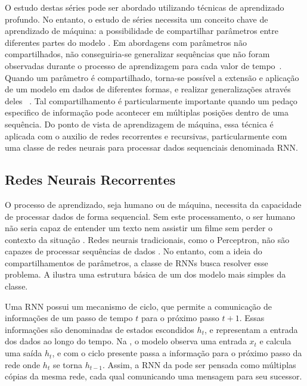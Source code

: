 O estudo destas séries pode ser abordado utilizando técnicas de aprendizado profundo. No entanto, o estudo de séries necessita um conceito chave de aprendizado de máquina: a possibilidade de compartilhar parâmetros entre diferentes partes do modelo \cite{deep_learning}. Em abordagens com parâmetros não compartilhados, não conseguiria-se generalizar sequências que não foram observadas durante o processo de aprendizagem para cada valor de tempo~\cite{deep_learning}. Quando um parâmetro é compartilhado, torna-se possível a extensão e aplicação de um modelo em dados de diferentes formas, e realizar generalizações através deles~ \cite{deep_learning}. Tal compartilhamento é particularmente importante quando um pedaço especifico de informação pode acontecer em múltiplas posições dentro de uma sequência. Do ponto de vista de aprendizagem de máquina, essa técnica é aplicada com o auxilio de redes recorrentes e recursivas, particularmente com uma classe de redes neurais para processar dados sequenciais denominada \acrlong{RNN}.

\subsection{Redes Neurais Recorrentes}

O processo de aprendizado, seja humano ou de máquina, necessita da capacidade de processar dados de forma sequencial. Sem este processamento, o ser humano não seria capaz de entender um texto nem assistir um filme sem perder o contexto da situação \cite{}. Redes neurais tradicionais, como o Perceptron, não são capazes de processar sequências de dados \cite{}. No entanto, com a ideia do compartilhamentos de parâmetros, a classe de \acrfull{RNNs} \cite{rnn} busca resolver esse problema. A  ilustra uma estrutura básica de um dos modelo mais simples da classe.

%

Uma \acrshort{RNN} possui um mecanismo de ciclo, que permite a comunicação de informações de um passo de tempo $t$ para o próximo passo $t+1$. Essas informações são denominadas de estados escondidos $h_t$, e representam a entrada dos dados ao longo do tempo. Na , o modelo observa uma entrada $x_t$ e calcula uma saída $h_t$, e com o ciclo presente passa a informação para o próximo passo da rede onde $h_t$ se torna $h_{t-1}$. Assim, a \acrshort{RNN} da  pode ser pensada como múltiplas cópias da mesma rede, cada qual comunicando uma mensagem para seu sucessor.

